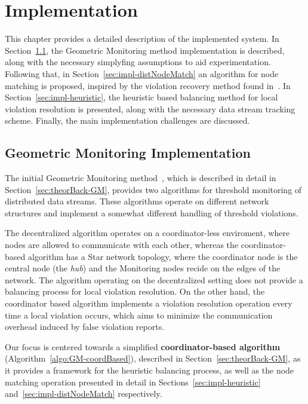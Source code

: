 \chapter{Implementation} \label{chap:impl}

This chapter provides a detailed description of the implemented system. In Section~\ref{sec:impl-GM}, the Geometric Monitoring method implementation is described, along with the necessary simplyfing assumptions to aid experimentation. Following that, in Section~\ref{sec:impl-distNodeMatch} an algorithm for node matching is proposed, inspired by the violation recovery method found in~\cite{Keren2014GMHetStreams}. In Section~\ref{sec:impl-heuristic}, the heuristic based balancing method for local violation resolution is presented, along with the necessary data stream tracking scheme. Finally, the main implementation challenges are discussed.

\section{Geometric Monitoring Implementation} \label{sec:impl-GM}

The initial Geometric Monitoring method~\cite{Sharfman2006GM}, which is described in detail in Section~\ref{sec:theorBack-GM}, provides two algorithms for threshold monitoring of distributed data streams. These algorithms operate on different network structures and implement a somewhat different handling of threshold violations.

The decentralized algorithm operates on a coordinator-less enviroment, where nodes are allowed to communicate with each other, whereas the coordinator-based algorithm has a Star network topology, where the coordinator node is the central node (the \emph{hub}) and the Monitoring nodes recide on the edges of the network.
The algorithm operating on the decentralized setting does not provide a balancing process for local violation resolution. On the other hand, the coordinator based algorithm implements a violation resolution operation every time a local violation occurs, which aims to minimize the communication overhead induced by false violation reports. 

Our focus is centered towards a simplified \textbf{coordinator-based algorithm} (Algorithm~\ref{algo:GM-coordBased}), described in Section~\ref{sec:theorBack-GM}, as it provides a framework for the heuristic balancing process, as well as the node matching operation presented in detail in Sections~\ref{sec:impl-heuristic} and~\ref{sec:impl-distNodeMatch} respectively.

